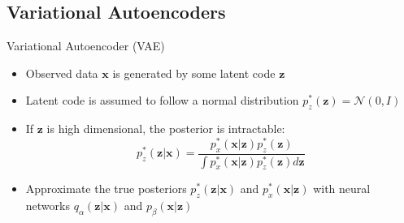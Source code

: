 \documentclass{beamer}
\newcommand{\vect}[1]{\boldsymbol{#1}}
\theoremstyle{definition}
\begin{document}
\subsection{Variational Autoencoders}
\begin{frame}{Variational Autoencoder (VAE)}
\begin{itemize}
  \item Observed data $\vect x$ is generated by some latent code $\vect z$%
  \item Latent code is assumed to follow a normal distribution $p_z^*(\vect z) = \mathcal{N}(0,I)$
  \item If $\vect z$ is high dimensional, the posterior is intractable:
    \[p_z^*(\vect z | \vect x) = \frac{p_x^*(\vect x | \vect z) p_z^*(\vect z)}{\displaystyle \int p_x^*(\vect x | \vect z) p_z^*(\vect z) d\vect z}\]
  \item<2-> Approximate the true posteriors $p_z^*(\vect z | \vect x)$ and $p_x^*(\vect x | \vect z)$ with neural networks $q_\alpha(\vect z | \vect x)$ and $p_\beta(\vect x | \vect z)$


\end{itemize}
\end{frame}
\end{document}
